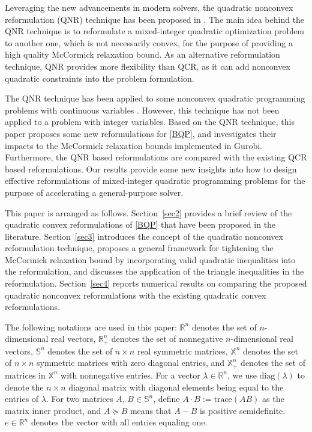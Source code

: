 \documentclass[pdflatex,sn-mathphys-num]{sn-jnl}%
\theoremstyle{thmstyleone}%
\theoremstyle{thmstyletwo}%
\theoremstyle{thmstylethree}%
\begin{document}


Leveraging the new advancements in modern solvers, the quadratic nonconvex reformulation (QNR) technique has been proposed in \cite{QNR}. The main idea behind the QNR technique is to reformulate a mixed-integer quadratic optimization problem to another one, which is not necessarily convex, for the purpose of providing a high quality McCormick relaxation bound. As an alternative reformulation technique, QNR provides more flexibility than QCR, as it can add nonconvex quadratic constraints into the problem formulation.

The QNR technique has been applied to some nonconvex quadratic programming problems with continuous variables \cite{QNR}. However, this technique has not been applied to a problem with integer variables. Based on the QNR technique, this paper proposes some new reformulations for \eqref{BQP}, and investigates their impacts to the McCormick relaxation bounds implemented in Gurobi. Furthermore, the QNR based reformulations are compared with the existing QCR based reformulations. Our results provide some new insights into how to design effective reformulations of mixed-integer quadratic programming problems for the purpose of accelerating a general-purpose solver.

This paper is arranged as follows. Section~\ref{sec2} provides a brief review of the quadratic convex reformulations of \eqref{BQP} that have been proposed in the literature. Section~\ref{sec3} introduces the concept of the quadratic nonconvex reformulation technique, proposes a general framework for tightening the McCormick relaxation bound by incorporating valid quadratic inequalities into the reformulation, and discusses the application of the triangle inequalities in the reformulation. Section~\ref{sec4} reports numerical results on comparing the proposed quadratic nonconvex reformulations with the existing quadratic convex reformulations.


The following notations are used in this paper: $\mathbb{R}^n$ denotes the set of $n$-dimensional real vectors, $\mathbb{R}^n_+$ denotes the set of nonnegative $n$-dimensional real vectors, $\mathbb{S}^n$ denotes the set of $n\times n$ real symmetric matrices, $\mathbb{X}^n$ denotes the set of $n\times n$ symmetric matrices with zero diagonal entries, and  $\mathbb{X}_+^n$ denotes the set of matrices in $\mathbb{X}^n$ with nonnegative entries.
For a vector $\lambda\in\mathbb{R}^n$, we use $\textrm{diag}(\lambda)$ to denote the $n\times n$ diagonal matrix with diagonal elements being equal to the entries of $\lambda$. For two matrices $A$, $B\in\mathbb{S}^n$, define $A\cdot B := \textrm{trace}(AB)$ as the matrix inner product, and $A\succeq B$ means that $A-B$ is positive semidefinite. $e\in\mathbb{R}^n$ denotes the vector with all entries equaling one.
\end{document}

